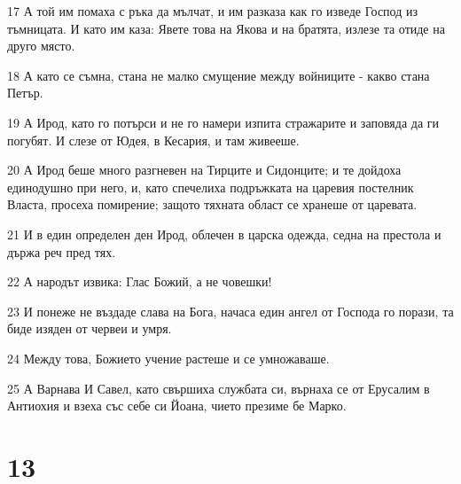 \par 17 А той им помаха с ръка да мълчат, и им разказа как го изведе Господ из тъмницата. И като им каза: Явете това на Якова и на братята, излезе та отиде на друго място.
\par 18 А като се съмна, стана не малко смущение между войниците - какво стана Петър.
\par 19 А Ирод, като го потърси и не го намери изпита стражарите и заповяда да ги погубят. И слезе от Юдея, в Кесария, и там живееше.
\par 20 А Ирод беше много разгневен на Тирците и Сидонците; и те дойдоха единодушно при него, и, като спечелиха подръжката на царевия постелник Власта, просеха помирение; защото тяхната област се хранеше от царевата.
\par 21 И в един определен ден Ирод, облечен в царска одежда, седна на престола и държа реч пред тях.
\par 22 А народът извика: Глас Божий, а не човешки!
\par 23 И понеже не въздаде слава на Бога, начаса един ангел от Господа го порази, та биде изяден от червеи и умря.
\par 24 Между това, Божието учение растеше и се умножаваше.
\par 25 А Варнава И Савел, като свършиха службата си, върнаха се от Ерусалим в Антиохия и взеха със себе си Йоана, чието презиме бе Марко.

\chapter{13}

